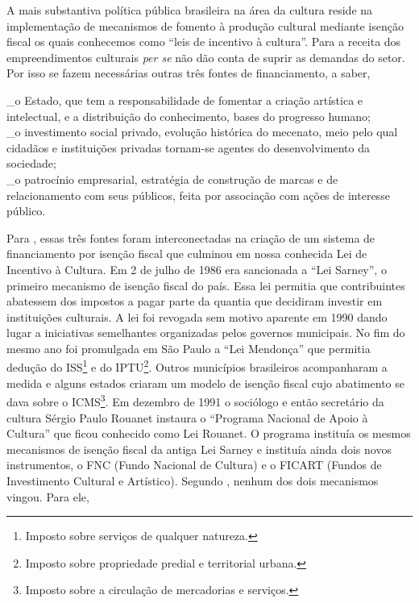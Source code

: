 \documentclass[a4paper, 12pt, openright, oneside, german, french, english, brazil]{abntex2}
\begin{document}
	A mais substantiva política pública brasileira na área da cultura reside na implementação de mecanismos de fomento à produção cultural mediante isenção fiscal os quais conhecemos como ``leis de incentivo à cultura''. Para  a receita dos empreendimentos culturais \textit{per se} não dão conta de suprir as demandas do setor. Por isso se fazem necessárias outras três fontes de financiamento, a saber, 
	
	\begin{citacao}
		\_o Estado, que tem a responsabilidade de fomentar a criação artística e intelectual, e a distribuição do conhecimento, bases do progresso humano;\\
		\_o investimento social privado, evolução histórica do mecenato, meio pelo qual cidadãos e instituições privadas tornam-se agentes do desenvolvimento da sociedade;\\
		\_o patrocínio empresarial, estratégia de construção de marcas e de relacionamento com
		seus públicos, feita por associação com ações de interesse público. \cite[p. 22]{sarkovas2005incentivo}
	\end{citacao}
	
	Para , essas três fontes foram interconectadas na criação de um sistema de financiamento por isenção fiscal que culminou em nossa conhecida Lei de Incentivo à Cultura. Em 2 de julho de 1986 era sancionada a ``Lei Sarney'', o primeiro mecanismo de isenção fiscal do país. Essa lei permitia que contribuintes abatessem dos impostos a pagar parte da quantia que decidiram investir em instituições culturais. A lei foi revogada sem motivo aparente em 1990 dando lugar a iniciativas semelhantes organizadas pelos governos municipais. No fim do mesmo ano foi promulgada em São Paulo a ``Lei Mendonça'' que permitia dedução do ISS\footnote{Imposto sobre serviços de qualquer natureza.} e do IPTU\footnote{Imposto sobre propriedade predial e territorial urbana.}. Outros municípios brasileiros acompanharam a medida e alguns estados criaram um modelo de isenção fiscal cujo abatimento se dava sobre o ICMS\footnote{Imposto sobre a circulação de mercadorias e serviços.}. Em dezembro de 1991 o sociólogo e então secretário da cultura Sérgio Paulo Rouanet instaura o ``Programa Nacional de Apoio à Cultura'' que ficou conhecido como Lei Rouanet. O programa instituía os mesmos mecanismos de isenção fiscal da antiga Lei Sarney e instituía ainda dois novos instrumentos, o FNC (Fundo Nacional de Cultura) e o FICART (Fundos de Investimento Cultural e Artístico). Segundo , nenhum dos dois mecanismos vingou. Para ele,
	
\end{document}
